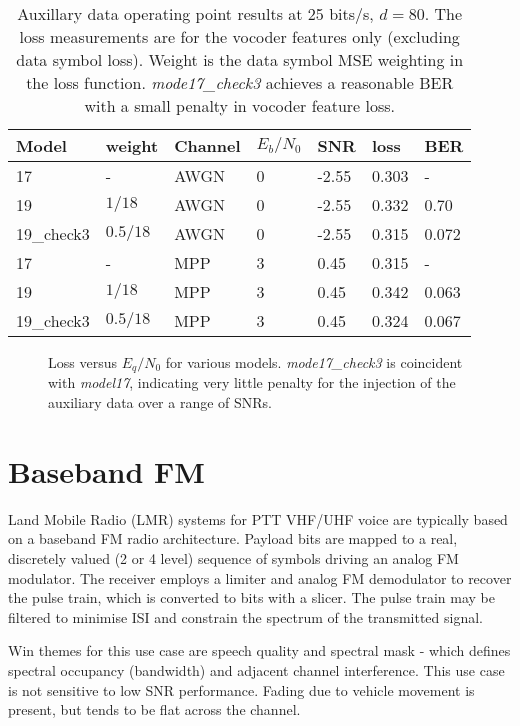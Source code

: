 \documentclass{article}
\begin{document}
\begin{table} [H]
\centering
\begin{tabular}{ l | l | l | l | l | l | l}
 \hline
 Model & weight & Channel & $E_b/N_0$ & SNR & loss & BER \\
 \hline
 17 & - & AWGN & 0 & -2.55 & 0.303 & - \\
 19 & $1/18$ & AWGN & 0 & -2.55 & 0.332 & 0.70 \\
 19\_check3 & $0.5/18$ & AWGN & 0 & -2.55 & 0.315 & 0.072 \\
 17 & - & MPP & 3 & 0.45 & 0.315 & - \\
 19 & $1/18$ & MPP & 3 & 0.45 & 0.342 & 0.063 \\
 19\_check3 & $0.5/18$ & MPP & 3 & 0.45 & 0.324 & 0.067 \\
 \hline
\end{tabular}
\caption{Auxillary data operating point results at 25 bits/s, $d=80$. The loss measurements are for the vocoder features only (excluding data symbol loss). Weight is the data symbol MSE weighting in the loss function. \emph{mode17\_check3} achieves a reasonable BER with a small penalty in vocoder feature loss.}
\label{tab:acq_data}
\end{table}

\begin{figure}[H]
\caption{Loss versus $E_q/N_0$ for various models. \emph{mode17\_check3} is coincident with  \emph{model17}, indicating very little penalty for the injection of the auxiliary data over a range of SNRs.}
\label{fig:loss_eqno_models}
\begin{center}

\end{center}
\end{figure}

\section{Baseband FM}

Land Mobile Radio (LMR) systems for PTT VHF/UHF voice are typically based on a baseband FM radio architecture. Payload bits are mapped to a real, discretely valued (2 or 4 level) sequence of symbols driving an analog FM modulator.  The receiver employs a limiter and analog FM demodulator to recover the pulse train, which is converted to bits with a slicer.  The pulse train may be filtered to minimise ISI and constrain the spectrum of the transmitted signal.

Win themes for this use case are speech quality and spectral mask - which defines spectral occupancy (bandwidth) and adjacent channel interference. This use case is not sensitive to low SNR performance.  Fading due to vehicle movement is present, but tends to be flat across the channel.
\end{document}
